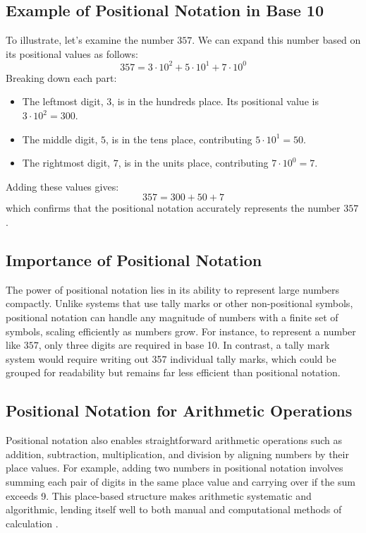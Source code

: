 \subsection{Example of Positional Notation in Base 10}

To illustrate, let’s examine the number \( 357 \). We can expand this number based on its positional values as follows:
\[
357 = 3 \cdot 10^2 + 5 \cdot 10^1 + 7 \cdot 10^0
\]
Breaking down each part:
\begin{itemize}
    \item The leftmost digit, \( 3 \), is in the hundreds place. Its positional value is \( 3 \cdot 10^2 = 300 \).
    \item The middle digit, \( 5 \), is in the tens place, contributing \( 5 \cdot 10^1 = 50 \).
    \item The rightmost digit, \( 7 \), is in the units place, contributing \( 7 \cdot 10^0 = 7 \).
\end{itemize}
Adding these values gives:
\[
357 = 300 + 50 + 7
\]
which confirms that the positional notation accurately represents the number \( 357 \).

\subsection{Importance of Positional Notation}
The power of positional notation lies in its ability to represent large numbers compactly. Unlike systems that use tally marks or other non-positional symbols, positional notation can handle any magnitude of numbers with a finite set of symbols, scaling efficiently as numbers grow. For instance, to represent a number like \( 357 \), only three digits are required in base 10. In contrast, a tally mark system would require writing out 357 individual tally marks, which could be grouped for readability but remains far less efficient than positional notation.

\subsection{Positional Notation for Arithmetic Operations}
Positional notation also enables straightforward arithmetic operations such as addition, subtraction, multiplication, and division by aligning numbers by their place values. For example, adding two numbers in positional notation involves summing each pair of digits in the same place value and carrying over if the sum exceeds 9. This place-based structure makes arithmetic systematic and algorithmic, lending itself well to both manual and computational methods of calculation \cite{burton2010-number}.



